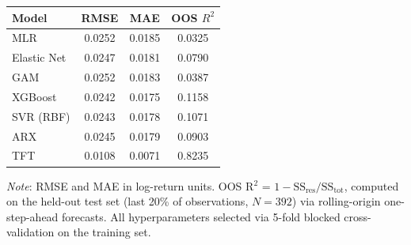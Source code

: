 \begin{tabular}{lccc}
  \toprule
  \textbf{Model} & \textbf{RMSE} & \textbf{MAE} & \textbf{OOS $R^2$} \\ 
  \midrule
  MLR & 0.0252 & 0.0185 & 0.0325 \\ 
  Elastic Net & 0.0247 & 0.0181 & 0.0790 \\ 
  GAM & 0.0252 & 0.0183 & 0.0387 \\ 
  XGBoost & 0.0242 & 0.0175 & 0.1158 \\ 
  SVR (RBF) & 0.0243 & 0.0178 & 0.1071 \\ 
  ARX & 0.0245 & 0.0179 & 0.0903 \\ 
  TFT & 0.0108 & 0.0071 & 0.8235 \\ 
  \bottomrule
\end{tabular}
\par\vspace{4pt}
\begin{minipage}{\linewidth}
  \footnotesize \textit{Note}: RMSE and MAE in log-return units. OOS R$^2$ = $1 - \text{SS}_{\text{res}} / \text{SS}_{\text{tot}}$, computed on the held-out test set (last 20\% of observations, $N=392$) via rolling-origin one-step-ahead forecasts. All hyperparameters selected via 5-fold blocked cross-validation on the training set.
\end{minipage}